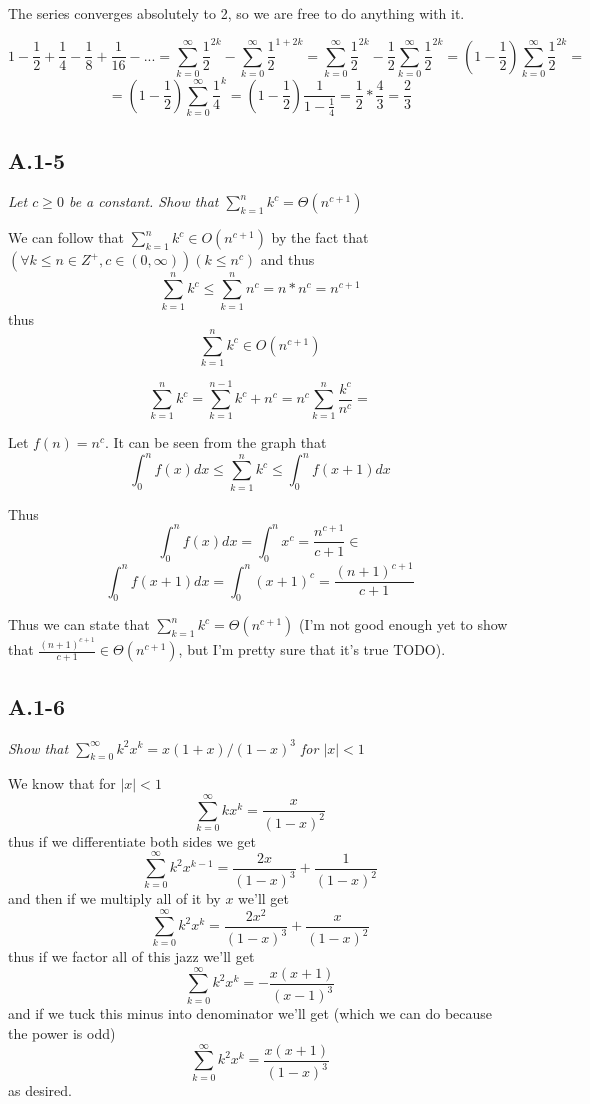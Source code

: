 \documentclass[11pt,oneside,titlepage]{book}
\begin{document}
The series converges absolutely to 2, so we are free to do anything with it.

$$1 - \frac 1 2 + \frac 1 4 - \frac 1 8
+ \frac{1}{16} - ... = 
\sum_{k = 0}^{\infty}{\frac{1}{2}^{2k}}
- \sum_{k = 0}^{\infty}{\frac{1}{2}^{1 + 2k}} =
\sum_{k = 0}^{\infty}{\frac{1}{2}^{2k}}
- \frac{1}{2}\sum_{k = 0}^{\infty}{\frac{1}{2}^{2k}} =
\left(1 - \frac{1}{2}\right)\sum_{k = 0}^{\infty}{\frac{1}{2}^{2k}} = 
$$
$$
= \left(1 - \frac{1}{2}\right)\sum_{k = 0}^{\infty}{\frac{1}{4}^{k}}
= \left(1 - \frac{1}{2}\right)\frac{1}{1 - \frac{1}{4}}
= \frac 1 2 *  \frac 4 3 = \frac 2 3
$$

\subsection*{A.1-5}
\textit{Let $c \geq 0$ be a constant. Show that
  $\sum_{k = 1}^{n}{k^c} = \Theta(n^{c + 1})$}

We can follow that $\sum_{k = 1}^{n}{k^c} \in O(n^{c + 1})$ by
the fact that $(\forall k \leq n \in Z^+, c \in (0, \infty))(k \leq n^c)$
and thus
$$\sum_{k = 1}^{n}{k^c} \leq \sum_{k = 1}^{n}{n^c} = n * n^c = n^{c + 1}$$
thus
$$\sum_{k = 1}^{n}{k^c} \in O(n^{c + 1})$$


$$
\sum_{k = 1}^{n}{k^c} = \sum_{k = 1}^{n - 1}{k^c} + n^c =
n^c\sum_{k = 1}^{n}{\frac{k^c}{n^c}} =
$$

Let $f(n) = n^c$.
It can be seen from the graph that
$$\int_{0}^{n}{f(x)dx} \leq \sum_{k = 1}^{n}{k^c} \leq
\int_{0}^{n}{f(x + 1)dx}$$

Thus 
$$\int_0^n{f(x)dx} = \int_0^n{x^c} = \frac{n^{c + 1}}{c + 1} \in$$
$$\int_0^n{f(x + 1)dx} = \int_0^n{(x + 1)^c} = \frac{(n + 1)^{c + 1}}{c + 1}$$

Thus we can state that $\sum_{k = 1}^{n}{k^c} = \Theta(n^{c + 1})$
(I'm not good enough yet to show that $\frac{(n + 1)^{c + 1}}{c + 1} \in
\Theta(n^{c + 1})$, but I'm pretty sure that it's true TODO).



\subsection*{A.1-6}
\textit{Show that $\sum_{k=0}^{\infty}{k^2 x^k} = x(1 + x)/(1 - x)^3$ for
  $|x| < 1$}

We know that for $|x| < 1$
$$\sum_{k = 0}^{\infty}{kx^k} = \frac{x}{(1 - x)^2}$$
thus if we differentiate both sides we get
$$\sum_{k = 0}^{\infty}{k^2x^{k - 1}} = \frac{2x}{(1 - x)^3}
+ \frac{1}{(1 - x)^2} $$
and then if we multiply all of it by $x$ we'll get
$$\sum_{k = 0}^{\infty}{k^2x^k} = \frac{2x^2}{(1 - x)^3}
+ \frac{x}{(1 - x)^2} $$
thus if we factor all of this jazz we'll get
$$\sum_{k = 0}^{\infty}{k^2x^k} = - \frac{x(x + 1)}{(x - 1)^3}$$
and if we tuck this minus into denominator we'll get (which we can do because
the power is odd)
$$\sum_{k = 0}^{\infty}{k^2x^k} = \frac{x(x + 1)}{(1 - x)^3}$$
as desired.
\end{document}
